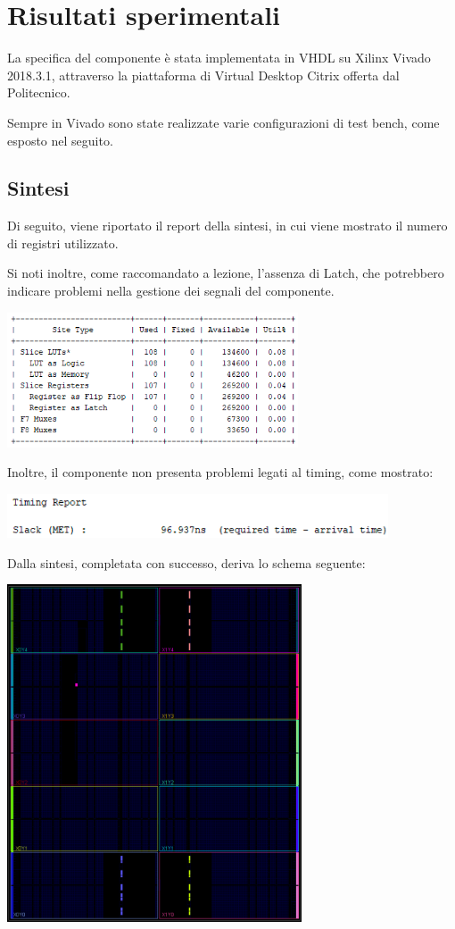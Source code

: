 \documentclass[a4paper,11pt]{article} %
\begin{document}
    \section{Risultati sperimentali}\label{sec:risultati-sperimentali}
    La specifica del componente è stata implementata in VHDL su Xilinx Vivado 2018.3.1, attraverso la piattaforma di Virtual Desktop Citrix offerta dal Politecnico.

    Sempre in Vivado sono state realizzate varie configurazioni di test bench, come esposto nel seguito.

    \subsection{Sintesi}\label{subsec:sintesi}
    Di seguito, viene riportato il report della sintesi, in cui viene mostrato il numero di registri utilizzato.

    Si noti inoltre, come raccomandato a lezione, l'assenza di Latch, che potrebbero indicare problemi nella gestione dei segnali del componente.

    \medskip

    \includegraphics[height=4cm]{../res/report-registri}

    Inoltre, il componente non presenta problemi legati al timing, come mostrato:
    \smallskip

    \includegraphics[height=1.3cm]{../res/report-timing}

    Dalla sintesi, completata con successo, deriva lo schema seguente:

    \medskip

    \includegraphics[height=10cm]{../res/design-sintesi}
\end{document}

